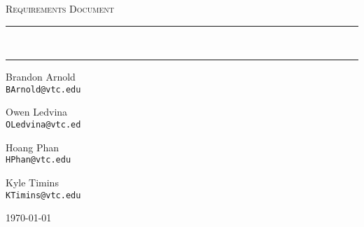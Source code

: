 \begin{titlepage}
  \begin{center}
    \textsc{\LARGE \class}
    \vspace{1.5 cm}

    \textsc{\Large Requirements Document}
    \vspace{0.5 cm}

    \hrule \vspace{0.4 cm}
    { \Huge \bfseries \theTitle}\\\vspace{0.4 cm}
    { \huge \bfseries \subTitle}\vspace{0.4 cm}
    \hrule \vspace{1.5 cm}

    \begin{minipage}{0.4\textwidth}
    \begin{flushleft} {\large
        \begin{center}
       Brandon Arnold\\
       		\texttt{BArnold@vtc.edu}
       		
       Owen Ledvina\\
       		\texttt{OLedvina@vtc.ed}

        \end{center} }
        \end{flushleft}
        \end{minipage}
        \begin{minipage}{0.4\textwidth}
        \begin{flushright} { \large
            \begin{center}
            Hoang Phan\\
                \texttt{HPhan@vtc.edu}

            Kyle Timins\\
                \texttt{KTimins@vtc.edu}
            \end{center} }
        \end{flushright}
    \end{minipage}

            \vfill

    {\large \today}

\end{center}

\end{titlepage}

